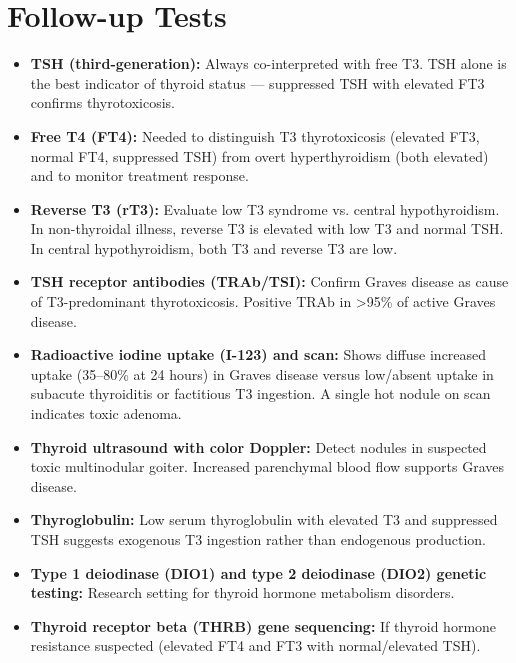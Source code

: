 \section*{Follow-up Tests}
\begin{itemize}
  \item \textbf{TSH (third-generation):} Always co-interpreted with free T3. TSH alone is the best indicator of thyroid status --- suppressed TSH with elevated FT3 confirms thyrotoxicosis.
  \item \textbf{Free T4 (FT4):} Needed to distinguish T3 thyrotoxicosis (elevated FT3, normal FT4, suppressed TSH) from overt hyperthyroidism (both elevated) and to monitor treatment response.
  \item \textbf{Reverse T3 (rT3):} Evaluate low T3 syndrome vs. central hypothyroidism. In non-thyroidal illness, reverse T3 is elevated with low T3 and normal TSH. In central hypothyroidism, both T3 and reverse T3 are low.
  \item \textbf{TSH receptor antibodies (TRAb/TSI):} Confirm Graves disease as cause of T3-predominant thyrotoxicosis. Positive TRAb in >95\% of active Graves disease.
  \item \textbf{Radioactive iodine uptake (I-123) and scan:} Shows diffuse increased uptake (35--80\% at 24 hours) in Graves disease versus low/absent uptake in subacute thyroiditis or factitious T3 ingestion. A single hot nodule on scan indicates toxic adenoma.
  \item \textbf{Thyroid ultrasound with color Doppler:} Detect nodules in suspected toxic multinodular goiter. Increased parenchymal blood flow supports Graves disease.
  \item \textbf{Thyroglobulin:} Low serum thyroglobulin with elevated T3 and suppressed TSH suggests exogenous T3 ingestion rather than endogenous production.
  \item \textbf{Type 1 deiodinase (DIO1) and type 2 deiodinase (DIO2) genetic testing:} Research setting for thyroid hormone metabolism disorders.
  \item \textbf{Thyroid receptor beta (THRB) gene sequencing:} If thyroid hormone resistance suspected (elevated FT4 and FT3 with normal/elevated TSH).
\end{itemize}

